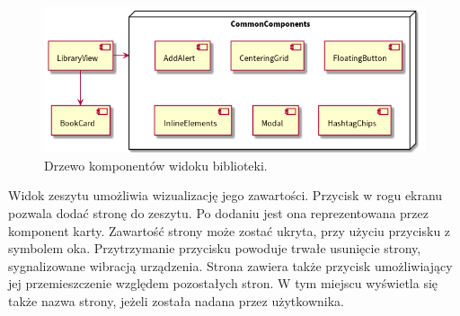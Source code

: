 \begin{figure}[H]
	\begin{center}
		\includegraphics[scale=0.6]{media/LibraryComponents.png}
	\end{center}
	\caption{Drzewo komponentów widoku biblioteki.}
	\label{rys:library-components}
\end{figure}

Widok zeszytu umożliwia wizualizację jego zawartości. Przycisk w rogu ekranu pozwala dodać stronę do zeszytu.
Po dodaniu jest ona reprezentowana przez komponent karty. Zawartość strony może zostać ukryta,
przy użyciu przycisku z symbolem oka. Przytrzymanie przycisku powoduje trwałe usunięcie strony, sygnalizowane wibracją urządzenia.
Strona zawiera także przycisk umożliwiający jej przemieszczenie względem pozostałych stron. W tym miejscu wyświetla się także nazwa
strony, jeżeli została nadana przez użytkownika.

